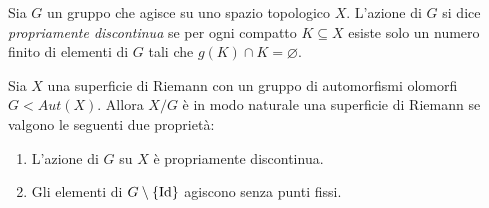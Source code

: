 \begin{definizione}
Sia $G$ un gruppo che agisce su uno spazio topologico $X$. L'azione di $G$ si dice \textit{propriamente discontinua} se per ogni compatto $K\subseteq X$ esiste solo un numero finito di elementi di $G$ tali che $g(K)\cap K =\varnothing$.
\end{definizione}
\begin{fatto}
Sia $X$ una superficie di Riemann con un gruppo di automorfismi olomorfi $G<Aut(X)$. Allora $X/G$ è in modo naturale una superficie di Riemann se valgono le seguenti due proprietà:
\begin{enumerate}
  \item L'azione di $G$ su $X$ è propriamente discontinua.
  \item Gli elementi di $G\setminus\{\text{Id}\}$ agiscono senza punti fissi.
\end{enumerate}
\end{fatto}
